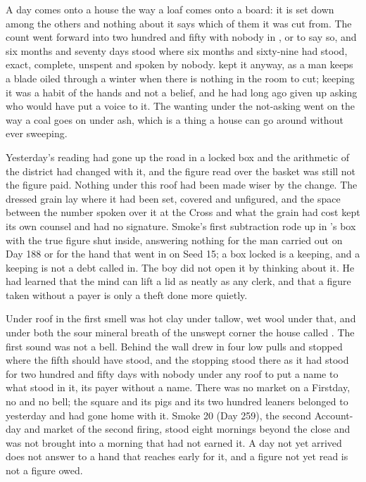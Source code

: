 
A day comes onto a house the way a loaf comes onto a board: it is set down among the others and nothing about it says which of them it was cut from. The count went forward into two hundred and fifty with nobody in ,  or  to say so, and six months and seventy days stood where six months and sixty-nine had stood, exact, complete, unspent and spoken by nobody.  kept it anyway, as a man keeps a blade oiled through a winter when there is nothing in the room to cut; keeping it was a habit of the hands and not a belief, and he had long ago given up asking who would have put a voice to it. The wanting under the not-asking went on the way a coal goes on under ash, which is a thing a house can go around without ever sweeping.

Yesterday's reading had gone up the road in a locked box and the arithmetic of the district had changed with it, and the figure read over the basket was still not the figure paid. Nothing under this roof had been made wiser by the change. The dressed grain lay where it had been set, covered and unfigured, and the space between the number spoken over it at the Cross and what the grain had cost kept its own counsel and had no signature. Smoke's first subtraction rode up  in 's box with the true figure shut inside, answering nothing for the man carried out on Day 188 or for the hand that went in on Seed 15; a box locked is a keeping, and a keeping is not a debt called in. The boy did not open it by thinking about it. He had learned that the mind can lift a lid as neatly as any clerk, and that a figure taken without a payer is only a theft done more quietly.

Under  roof in  the first smell was hot clay under tallow, wet wool under that, and under both the sour mineral breath of the unswept corner the house called . The first sound was not a bell. Behind the wall  drew in four low pulls and stopped where the fifth should have stood, and the stopping stood there as it had stood for two hundred and fifty days with nobody under any roof to put a name to what stood in it, its payer without a name. There was no market on a Firstday, no  and no bell; the square and its pigs and its two hundred leaners belonged to yesterday and had gone home with it. Smoke 20 (Day 259), the second Account-day and market of the second firing, stood eight mornings beyond the close and was not brought into a morning that had not earned it. A day not yet arrived does not answer to a hand that reaches early for it, and a figure not yet read is not a figure owed.

